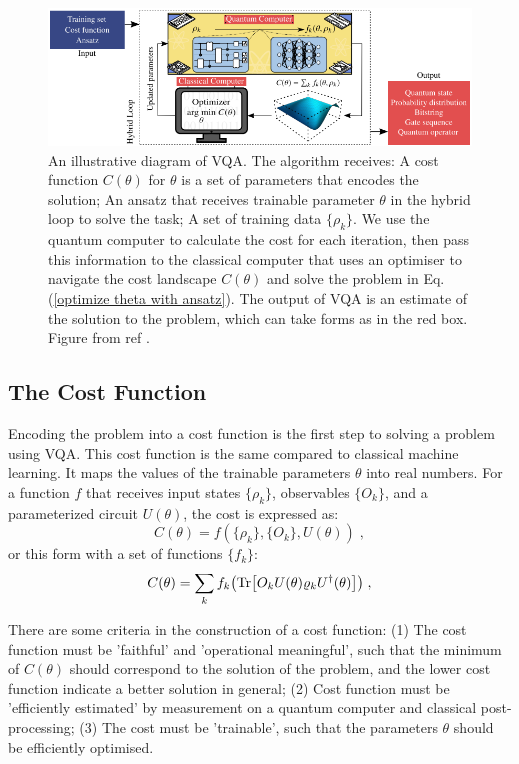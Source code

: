\begin{figure}
    \centering
    \includegraphics[width=\textwidth]{LiteratureReview/Appendices/vqadiagram.png}
    \caption{
    An illustrative diagram of VQA. The algorithm receives: 
    A cost function $C(\theta)$ for $\theta$ is a set of parameters that encodes the solution; 
    An ansatz that receives trainable parameter $\theta$ in the hybrid loop to solve the task;
    A set of training data $\{\rho_k\}$.
    We use the quantum computer to calculate the cost for each iteration, then pass this information to the classical computer that uses an optimiser to navigate the cost landscape $C(\theta)$ and solve the problem in Eq. (\ref{optimize theta with ansatz}).
    The output of VQA is an estimate of the solution to the problem, which can take forms as in the red box.
    Figure from ref \cite{cerezo2021variational}.
    }
    \label{VQA diagram}
\end{figure}

\subsection{The Cost Function}
Encoding the problem into a cost function is the first step to solving a problem using VQA.
This cost function is the same  compared to classical machine learning. It maps the values of the trainable parameters $\theta$ into real numbers.
For a function $f$ that receives input states $\{\rho_k\}$, observables $\{O_k\}$, and a parameterized circuit $U(\theta)$, the cost is expressed as:
\begin{equation}
    C(\theta) = f(\{\rho_k\}, \{O_k\}, U(\theta)) \;,
\end{equation}
or this form with a set of functions $\{ f_k \}$:
\begin{equation}
    C(\theta) = \sum_k f_k \left(\Tr[ O_k U(\theta) \rho_k U^\dagger(\theta) ]\right) \;,
    \label{Cost function}
\end{equation}

There are some criteria in the construction of a cost function: 
(1) The cost function must be 'faithful' and 'operational meaningful', such that the minimum of $C(\theta)$ should correspond to the solution of the problem, and the lower cost function indicate a better solution in general;
(2) Cost function must be 'efficiently estimated' by measurement on a quantum computer and classical post-processing;
(3) The cost must be 'trainable', such that the parameters $\theta$ should be efficiently optimised.

